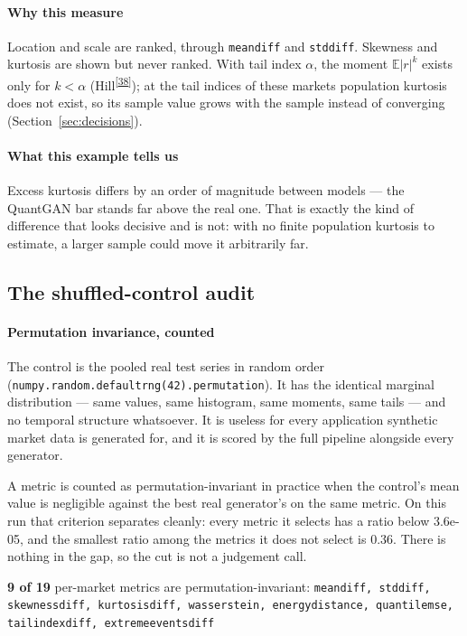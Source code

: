 \documentclass[11pt,a4paper]{article}
\makeatletter
\newcommand{\tcite}[1]{\textsuperscript{[\hyperlink{R:#1}{#1}]}}
\DeclareRobustCommand{\_}{\ifmmode\nfss@text{\textunderscore}\else\textunderscore\allowbreak\fi}
\newcommand{\E}{\mathbb{E}}
\makeatother
\begin{document}
\paragraph{Why this measure} Location and scale are ranked, through \texttt{mean\_diff} and \texttt{std\_diff}. Skewness and kurtosis are shown but never ranked. With tail index $\alpha$, the moment $\E|r|^k$ exists only for $k<\alpha$ (Hill\tcite{38}); at the tail indices of these markets population kurtosis does not exist, so its sample value grows with the sample instead of converging (Section~\ref{sec:decisions}).

\paragraph{What this example tells us} Excess kurtosis differs by an order of magnitude between models --- the QuantGAN bar stands far above the real one. That is exactly the kind of difference that looks decisive and is not: with no finite population kurtosis to estimate, a larger sample could move it arbitrarily far.

\subsection{The shuffled-control audit}
\label{sec:audit}

\paragraph{Permutation invariance, counted} The control is the pooled real test series in random order (\texttt{numpy.random.default\_rng(42).permutation}). It has the identical marginal distribution --- same values, same histogram, same moments, same tails --- and no temporal structure whatsoever. It is useless for every application synthetic market data is generated for, and it is scored by the full pipeline alongside every generator.

A metric is counted as permutation-invariant in practice when the control's mean value is negligible against the best real generator's on the same metric. On this run that criterion separates cleanly: every metric it selects has a ratio below 3.6e-05, and the smallest ratio among the metrics it does not select is 0.36. There is nothing in the gap, so the cut is not a judgement call.

\textbf{9 of 19} per-market metrics are permutation-invariant:
{\footnotesize\texttt{mean\_diff, std\_diff, skewness\_diff, kurtosis\_diff, wasserstein, energy\_distance, quantile\_mse, tail\_index\_diff, extreme\_events\_diff}}
\end{document}
